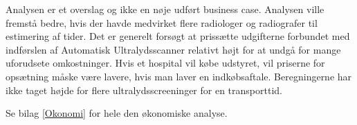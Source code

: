 Analysen er et overslag og ikke en nøje udført business case. Analysen ville fremstå bedre, hvis der havde medvirket flere radiologer og radiografer til estimering af tider. Det er generelt forsøgt at prissætte udgifterne forbundet med indførslen af Automatisk Ultralydsscanner relativt højt for at undgå for mange uforudsete omkostninger. Hvis et hospital vil købe udstyret, vil priserne for opsætning måske være lavere, hvis man laver en indkøbsaftale. Beregningerne har ikke taget højde for flere ultralydsscreeninger for en transporttid. 

Se bilag \ref{Okonomi} for hele den økonomiske analyse. 
